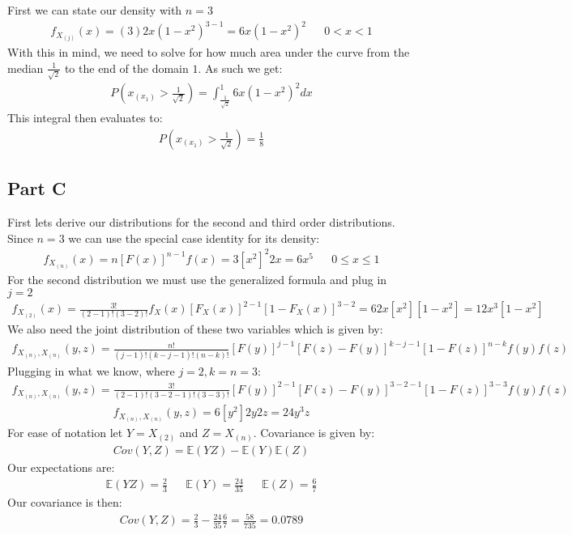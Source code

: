 \documentclass{article}
\begin{document}
First we can state our density with $n=3$
\begin{align*}
f_{X_{(j)}}(x) = (3) 2x (1-x^2)^{3-1} = 6x (1-x^2)^{2} && 0<x<1
\end{align*}
With this in mind, we need to solve for how much area under the curve from the median $\tfrac{1}{\sqrt{2}}$ to the end of the domain $1$. As such we get:
\begin{align*}
P(x_{(x_1)} > \tfrac{1}{\sqrt{2}}) = \int_{\tfrac{1}{\sqrt{2}}}^{1} 6x (1-x^2)^{2} dx
\end{align*}
This integral then evaluates to:
\begin{align*}
\boxed{ P(x_{(x_1)} > \tfrac{1}{\sqrt{2}}) = \frac{1}{8} }
\end{align*}
\subsection*{Part C}
First lets derive our distributions for the second and third order distributions. Since $n=3$ we can use the special case identity for its density:
\begin{align*}
f_{X_{(n)}}(x) = n[F(x)]^{n-1} f(x) = 3 [x^2]^2 2x = 6x^5 && 0 \leq x \leq 1 
\end{align*}
For the second distribution we must use the generalized formula and plug in $j=2$
\begin{align*}
f_{X_{(2)}}(x) = \frac{3!}{(2-1)!(3-2)!} f_X(x) [F_X(x)]^{2-1} [1-F_X(x)]^{3-2} = 6 2x [x^2] [1-x^2] = 12x^3[1-x^2]
\end{align*}
We also need the joint distribution of these two variables which is given by:
\begin{align*}
f_{X_{(n)},X_{(n)}}(y,z) = \frac{n!}{(j-1)!(k-j-1)!(n-k)!} [F(y)]^{j-1} [F(z)-F(y)]^{k-j-1} [1-F(z)]^{n-k} f(y) f(z)
\end{align*}
Plugging in what we know, where $j=2, k=n=3$:
\begin{align*}
f_{X_{(n)},X_{(n)}}(y,z) = \frac{3!}{(2-1)!(3-2-1)!(3-3)!} [F(y)]^{2-1} [F(z)-F(y)]^{3-2-1} [1-F(z)]^{3-3} f(y) f(z)
\end{align*}
\begin{align*}
f_{X_{(n)},X_{(n)}}(y,z) = 6 [y^2] 2y 2z = 24 y^3 z
\end{align*}
For ease of notation let $Y=X_{(2)}$ and $Z=X_{(n)}$. Covariance is given by:
\begin{align*}
Cov(Y,Z) = \mathbb{E}(YZ) - \mathbb{E}(Y)\mathbb{E}(Z)
\end{align*}
Our expectations are:
\begin{align*}
\mathbb{E}(YZ) =\frac{2}{3} && \mathbb{E}(Y) = \frac{24}{35} && \mathbb{E}(Z) = \frac{6}{7}
\end{align*}
Our covariance is then:
\begin{align*}
\boxed{ Cov(Y,Z) = \frac{2}{3} - \frac{24}{35}\frac{6}{7} = \frac{58}{735} = 0.0789 }
\end{align*}
\end{document}
